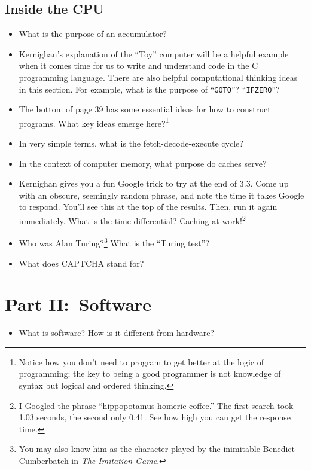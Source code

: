\documentclass[12pt]{article}
\begin{document}
\subsection*{Inside the CPU}
\begin{itemize}
	\item What is the purpose of an accumulator?
	\item Kernighan's explanation of the ``Toy'' computer will be a helpful example when it comes time for us to write and understand code in the C programming language. There are also helpful computational thinking ideas in this section. For example, what is the purpose of ``\texttt{GOTO}''? ``\texttt{IFZERO}''?
	\item The bottom of page 39 has some essential ideas for how to construct programs. What key ideas emerge here?\footnote{Notice how you don't need to program to get better at the logic of programming; the key to being a good programmer is not knowledge of syntax but logical and ordered thinking.}
	\item In very simple terms, what is the fetch-decode-execute cycle?
	\item In the context of computer memory, what purpose do caches serve?
	\item Kernighan gives you a fun Google trick to try at the end of 3.3. Come up with an obscure, seemingly random phrase, and note the time it takes Google to respond. You'll see this at the top of the results. Then, run it again immediately. What is the time differential? Caching at work!\footnote{I Googled the phrase ``hippopotamus homeric coffee.'' The first search took 1.03 seconds, the second only 0.41. See how high you can get the response time.}
	\item Who was Alan Turing?\footnote{You may also know him as the character played by the inimitable Benedict Cumberbatch in \textit{The Imitation Game}.} What is the ``Turing test''?
	\item What does CAPTCHA stand for?
\end{itemize}

\hrulefill

\section*{Part II:\ Software}
\begin{itemize}
	\item What is software? How is it different from hardware?
\end{itemize}
\end{document}
